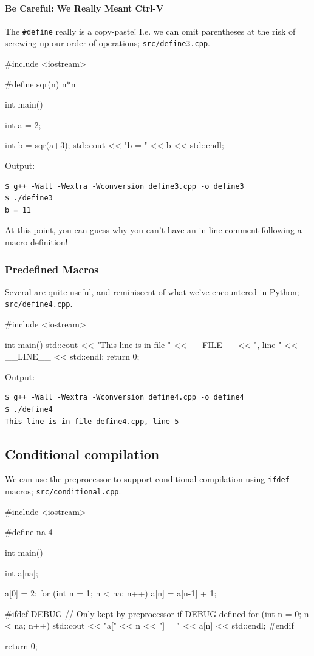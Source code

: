 \documentclass[12pt,letterpaper,twoside]{article}
\begin{document}
\paragraph{Be Careful: We Really Meant Ctrl-V} The \texttt{\#define} really is a 
copy-paste! I.e. we can omit parentheses at the risk of screwing up our order of operations;
\texttt{src/define3.cpp}.

\begin{cpp}
#include <iostream>

#define sqr(n) n*n

int main() {
  int a = 2;

  int b = sqr(a+3);
  std::cout << "b = " << b << std::endl;
}
\end{cpp}

Output:

\begin{verbatim}
$ g++ -Wall -Wextra -Wconversion define3.cpp -o define3
$ ./define3
b = 11
\end{verbatim}

At this point, you can guess why you can't have an in-line comment following a macro definition!

\subsubsection{Predefined Macros} Several are quite useful, and reminiscent of what we've
encountered in Python;
\texttt{src/define4.cpp}.

\begin{cpp}
#include <iostream>

int main() {
  std::cout << "This line is in file " << __FILE__
            << ", line " << __LINE__ << std::endl;
  return 0;
}
\end{cpp}

Output:

\begin{verbatim}
$ g++ -Wall -Wextra -Wconversion define4.cpp -o define4
$ ./define4
This line is in file define4.cpp, line 5
\end{verbatim}

\subsection{Conditional compilation}
We can use the preprocessor to support conditional compilation using \texttt{ifdef} macros;
\texttt{src/conditional.cpp}.

\begin{cpp}
#include <iostream>

#define na 4

int main() {
  int a[na];

  a[0] = 2;
  for (int n = 1; n < na; n++) a[n] = a[n-1] + 1;

#ifdef DEBUG
  // Only kept by preprocessor if DEBUG defined
  for (int n = 0; n < na; n++) {
    std::cout << "a[" << n << "] = " << a[n] << std::endl;
  }
#endif

  return 0;
}
\end{cpp}
\end{document}
